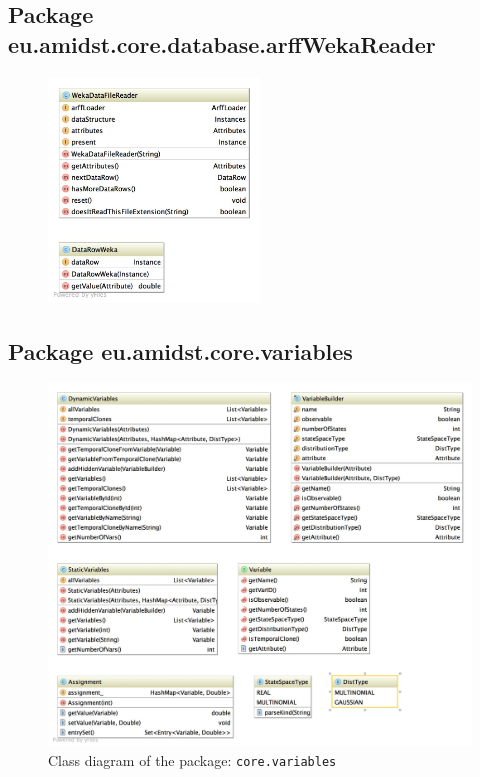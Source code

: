 \subsection{Package eu.amidst.core.database.arffWekaReader}
\begin{figure}[H]
  \centering
    \includegraphics[width=0.5\textwidth]{ClassDiagrams/core_database_filereaders_arffwekareader.jpg}
\end{figure}

\subsection{Package eu.amidst.core.variables}

\begin{figure}[H]
  \caption{Class diagram of the package: \texttt{core.variables}}
  \centering
    \includegraphics[width=\textwidth]{ClassDiagrams/core_variables.jpg}
\end{figure}

